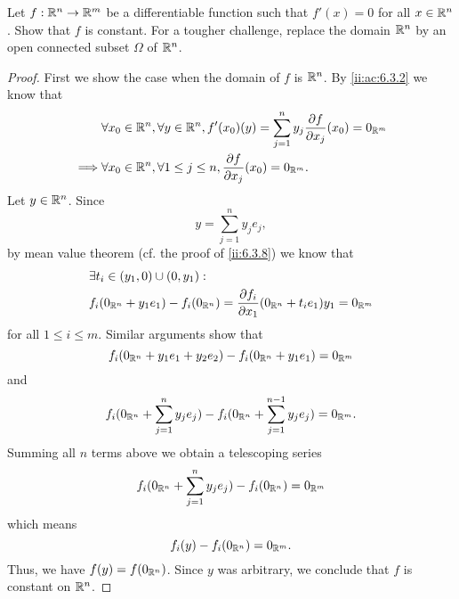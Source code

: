 \begin{ex}\label{ii:ex:6.3.4}
  Let \(f : \mathbb{R}^n \to \mathbb{R}^m\) be a differentiable function such that \(f'(x) = 0\) for all \(x \in \mathbb{R}^n\).
  Show that \(f\) is constant.
  For a tougher challenge, replace the domain \(\mathbb{R}^n\) by an open connected subset \(\Omega\) of \(\mathbb{R}^n\).
\end{ex}

\begin{proof}
  First we show the case when the domain of \(f\) is \(\mathbb{R}^n\).
  By \cref{ii:ac:6.3.2} we know that
  \begin{align*}
             & \forall x_0 \in \mathbb{R}^n, \forall y \in \mathbb{R}^n, f'(x_0)(y) = \sum_{j = 1}^n y_j \dfrac{\partial f}{\partial x_j}(x_0) = 0_{\mathbb{R}^m} \\
    \implies & \forall x_0 \in \mathbb{R}^n, \forall 1 \leq j \leq n, \dfrac{\partial f}{\partial x_j}(x_0) = 0_{\mathbb{R}^m}.
  \end{align*}
  Let \(y \in \mathbb{R}^n\).
  Since
  \[
    y = \sum_{j = 1}^n y_j e_j,
  \]
  by mean value theorem (cf. the proof of \cref{ii:6.3.8}) we know that
  \begin{align*}
     & \exists t_i \in (y_1, 0) \cup (0, y_1) :                                                                        \\
     & f_i(0_{\mathbb{R}^n} + y_1 e_1) - f_i(0_{\mathbb{R}^n}) = \dfrac{\partial f_i}{\partial x_1}(0_{\mathbb{R}^n} + t_i e_1) y_1 = 0_{\mathbb{R}^m}
  \end{align*}
  for all \(1 \leq i \leq m\).
  Similar arguments show that
  \[
    f_i(0_{\mathbb{R}^n} + y_1 e_1 + y_2 e_2) - f_i(0_{\mathbb{R}^n} + y_1 e_1) = 0_{\mathbb{R}^m}
  \]
  and
  \[
    f_i(0_{\mathbb{R}^n} + \sum_{j = 1}^n y_j e_j) - f_i(0_{\mathbb{R}^n} + \sum_{j = 1}^{n - 1} y_j e_j) = 0_{\mathbb{R}^m}.
  \]
  Summing all \(n\) terms above we obtain a telescoping series
  \[
    f_i(0_{\mathbb{R}^n} + \sum_{j = 1}^n y_j e_j) - f_i(0_{\mathbb{R}^n}) = 0_{\mathbb{R}^m}
  \]
  which means
  \[
    f_i(y) - f_i(0_{\mathbb{R}^n}) = 0_{\mathbb{R}^m}.
  \]
  Thus, we have \(f(y) = f(0_{\mathbb{R}^n})\).
  Since \(y\) was arbitrary, we conclude that \(f\) is constant on \(\mathbb{R}^n\).


\end{proof}
